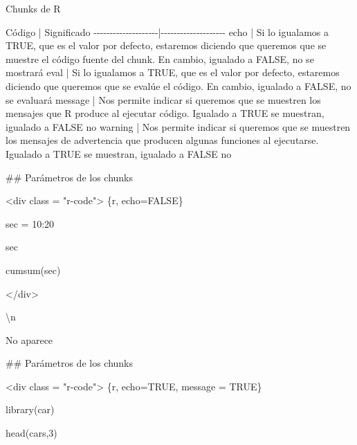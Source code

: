 \documentclass[
  ignorenonframetext,
]{beamer}
\newenvironment{Shaded}{\begin{snugshade}}{\end{snugshade}}
\newcommand{\NormalTok}[1]{#1}
\begin{document}
\begin{frame}[fragile]{Chunks de R}
\begin{Shaded}
\begin{Highlighting}[]
\NormalTok{Código |  Significado                                  }
\NormalTok{{-}{-}{-}{-}{-}{-}{-}{-}{-}{-}{-}{-}{-}{-}{-}{-}{-}{-}{-}{-}|{-}{-}{-}{-}{-}{-}{-}{-}{-}{-}{-}{-}{-}{-}{-}{-}{-}{-}{-}{-}}
\NormalTok{\textasciigrave{}echo\textasciigrave{} | Si lo igualamos a \textasciigrave{}TRUE\textasciigrave{}, que es el valor por defecto, estaremos diciendo que queremos que se muestre el código fuente del chunk. En cambio, igualado a \textasciigrave{}FALSE\textasciigrave{}, no se mostrará}
\NormalTok{\textasciigrave{}eval\textasciigrave{} | Si lo igualamos a \textasciigrave{}TRUE\textasciigrave{}, que es el valor por defecto, estaremos diciendo que queremos que se evalúe el código. En cambio, igualado a \textasciigrave{}FALSE\textasciigrave{}, no se evaluará}
\NormalTok{\textasciigrave{}message\textasciigrave{} | Nos permite indicar si queremos que se muestren los mensajes que R produce al ejecutar código. Igualado a \textasciigrave{}TRUE\textasciigrave{} se muestran, igualado a \textasciigrave{}FALSE\textasciigrave{} no}
\NormalTok{\textasciigrave{}warning\textasciigrave{} | Nos permite indicar si queremos que se muestren los mensajes de advertencia que producen algunas funciones al ejecutarse. Igualado a \textasciigrave{}TRUE\textasciigrave{} se muestran, igualado a \textasciigrave{}FALSE\textasciigrave{} no}

\NormalTok{\#\# Parámetros de los chunks}

\NormalTok{\textless{}div class = "r{-}code"\textgreater{}}
\NormalTok{\textasciigrave{}\textasciigrave{}\textasciigrave{}\{r, echo=FALSE\}}

\NormalTok{\textasciigrave{} sec = 10:20\textasciigrave{}}

\NormalTok{\textasciigrave{}sec\textasciigrave{}}

\NormalTok{\textasciigrave{}cumsum(sec)\textasciigrave{}}

\NormalTok{\textasciigrave{}\textasciigrave{}\textasciigrave{}\textless{}/div\textgreater{}}

\NormalTok{\textbackslash{}n}

\NormalTok{No aparece}

\NormalTok{\#\# Parámetros de los chunks}

\NormalTok{\textless{}div class = "r{-}code"\textgreater{}}
\NormalTok{\textasciigrave{}\textasciigrave{}\textasciigrave{}\{r, echo=TRUE, message = TRUE\}}

\NormalTok{\textasciigrave{}library(car)\textasciigrave{}}

\NormalTok{\textasciigrave{}head(cars,3)\textasciigrave{}}


\end{Highlighting}
\end{Shaded}
\end{frame}
\end{document}
